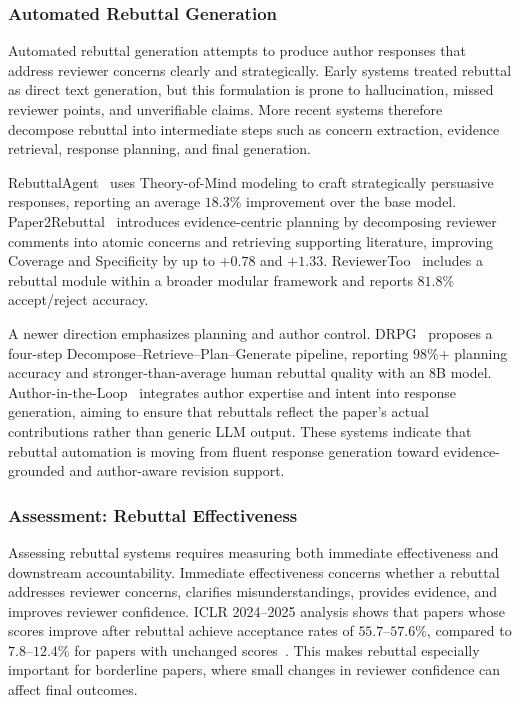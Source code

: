 \documentclass{llmxive}
\begin{document}
\subsubsection{Automated Rebuttal Generation}
\label{sec:rebuttal_gen}

Automated rebuttal generation attempts to produce author responses that address reviewer concerns clearly and strategically. Early systems treated rebuttal as direct text generation, but this formulation is prone to hallucination, missed reviewer points, and unverifiable claims. More recent systems therefore decompose rebuttal into intermediate steps such as concern extraction, evidence retrieval, response planning, and final generation.

RebuttalAgent~\cite{rebuttalagent2026} uses Theory-of-Mind modeling to craft strategically persuasive responses, reporting an average $18.3\%$ improvement over the base model. Paper2Rebuttal~\cite{paper2rebuttal2026} introduces evidence-centric planning by decomposing reviewer comments into atomic concerns and retrieving supporting literature, improving Coverage and Specificity by up to $+0.78$ and $+1.33$. ReviewerToo~\cite{reviewertoo2025} includes a rebuttal module within a broader modular framework and reports $81.8\%$ accept/reject accuracy.

A newer direction emphasizes planning and author control. DRPG~\cite{drpg2026} proposes a four-step Decompose--Retrieve--Plan--Generate pipeline, reporting $98\%$+ planning accuracy and stronger-than-average human rebuttal quality with an $8$B model. Author-in-the-Loop~\cite{ruan2026authorinloop} integrates author expertise and intent into response generation, aiming to ensure that rebuttals reflect the paper's actual contributions rather than generic LLM output. These systems indicate that rebuttal automation is moving from fluent response generation toward evidence-grounded and author-aware revision support.



\subsubsection{Assessment: Rebuttal Effectiveness}
\label{sec:rebuttal_effectiveness}

Assessing rebuttal systems requires measuring both immediate effectiveness and downstream accountability. Immediate effectiveness concerns whether a rebuttal addresses reviewer concerns, clarifies misunderstandings, provides evidence, and improves reviewer confidence. ICLR 2024--2025 analysis shows that papers whose scores improve after rebuttal achieve acceptance rates of $55.7$--$57.6\%$, compared to $7.8$--$12.4\%$ for papers with unchanged scores~\cite{iclr_rebuttal2025}. This makes rebuttal especially important for borderline papers, where small changes in reviewer confidence can affect final outcomes.
\end{document}
